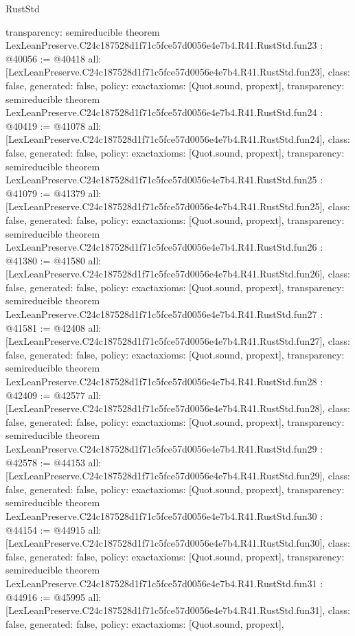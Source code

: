 \begin{lexlean}{RustStd}
\begin{coremodule}
{  transparency: semireducible
}
theorem LexLeanPreserve.C24c187528d1f71c5fce57d0056e4e7b4.R41.RustStd.fun23 : @40056 := @40418 {
  all: [LexLeanPreserve.C24c187528d1f71c5fce57d0056e4e7b4.R41.RustStd.fun23],
  class: false,
  generated: false,
  policy: exact{axioms: [Quot.sound, propext]},
  transparency: semireducible
}
theorem LexLeanPreserve.C24c187528d1f71c5fce57d0056e4e7b4.R41.RustStd.fun24 : @40419 := @41078 {
  all: [LexLeanPreserve.C24c187528d1f71c5fce57d0056e4e7b4.R41.RustStd.fun24],
  class: false,
  generated: false,
  policy: exact{axioms: [Quot.sound, propext]},
  transparency: semireducible
}
theorem LexLeanPreserve.C24c187528d1f71c5fce57d0056e4e7b4.R41.RustStd.fun25 : @41079 := @41379 {
  all: [LexLeanPreserve.C24c187528d1f71c5fce57d0056e4e7b4.R41.RustStd.fun25],
  class: false,
  generated: false,
  policy: exact{axioms: [Quot.sound, propext]},
  transparency: semireducible
}
theorem LexLeanPreserve.C24c187528d1f71c5fce57d0056e4e7b4.R41.RustStd.fun26 : @41380 := @41580 {
  all: [LexLeanPreserve.C24c187528d1f71c5fce57d0056e4e7b4.R41.RustStd.fun26],
  class: false,
  generated: false,
  policy: exact{axioms: [Quot.sound, propext]},
  transparency: semireducible
}
theorem LexLeanPreserve.C24c187528d1f71c5fce57d0056e4e7b4.R41.RustStd.fun27 : @41581 := @42408 {
  all: [LexLeanPreserve.C24c187528d1f71c5fce57d0056e4e7b4.R41.RustStd.fun27],
  class: false,
  generated: false,
  policy: exact{axioms: [Quot.sound, propext]},
  transparency: semireducible
}
theorem LexLeanPreserve.C24c187528d1f71c5fce57d0056e4e7b4.R41.RustStd.fun28 : @42409 := @42577 {
  all: [LexLeanPreserve.C24c187528d1f71c5fce57d0056e4e7b4.R41.RustStd.fun28],
  class: false,
  generated: false,
  policy: exact{axioms: [Quot.sound, propext]},
  transparency: semireducible
}
theorem LexLeanPreserve.C24c187528d1f71c5fce57d0056e4e7b4.R41.RustStd.fun29 : @42578 := @44153 {
  all: [LexLeanPreserve.C24c187528d1f71c5fce57d0056e4e7b4.R41.RustStd.fun29],
  class: false,
  generated: false,
  policy: exact{axioms: [Quot.sound, propext]},
  transparency: semireducible
}
theorem LexLeanPreserve.C24c187528d1f71c5fce57d0056e4e7b4.R41.RustStd.fun30 : @44154 := @44915 {
  all: [LexLeanPreserve.C24c187528d1f71c5fce57d0056e4e7b4.R41.RustStd.fun30],
  class: false,
  generated: false,
  policy: exact{axioms: [Quot.sound, propext]},
  transparency: semireducible
}
theorem LexLeanPreserve.C24c187528d1f71c5fce57d0056e4e7b4.R41.RustStd.fun31 : @44916 := @45995 {
  all: [LexLeanPreserve.C24c187528d1f71c5fce57d0056e4e7b4.R41.RustStd.fun31],
  class: false,
  generated: false,
  policy: exact{axioms: [Quot.sound, propext]},
}
\end{coremodule}
\end{lexlean}
